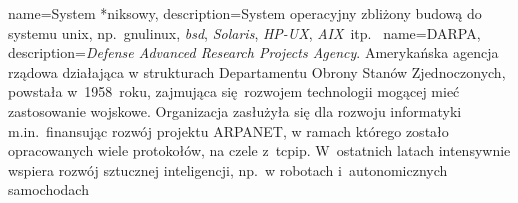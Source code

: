 {
	name={System \mbox{*niksowy}},
	description={System operacyjny zbliżony budową do systemu \gls{unix}, np.~\gls{gnulinux}, \emph{bsd}, \emph{Solaris}, \emph{HP-UX}, \emph{AIX}~itp.~\cite{wiki:unix-like}}
}
{
	name={DARPA},
	description={\emph{Defense Advanced Research Projects Agency}. Amerykańska agencja rządowa działająca w strukturach Departamentu Obrony Stanów Zjednoczonych, powstała w~1958~roku, zajmująca się~rozwojem technologii mogącej mieć zastosowanie wojskowe. Organizacja zasłużyła się dla rozwoju informatyki m.in.~finansując rozwój projektu ARPANET, w ramach którego zostało opracowanych wiele protokołów, na czele z~\gls{tcpip}. W~ostatnich latach intensywnie wspiera rozwój sztucznej inteligencji, np.~w robotach i~autonomicznych samochodach~\cite{darpa-grandchallange,darpa-robotics-challange,darpa-robotics-challange-ieee}}
}
